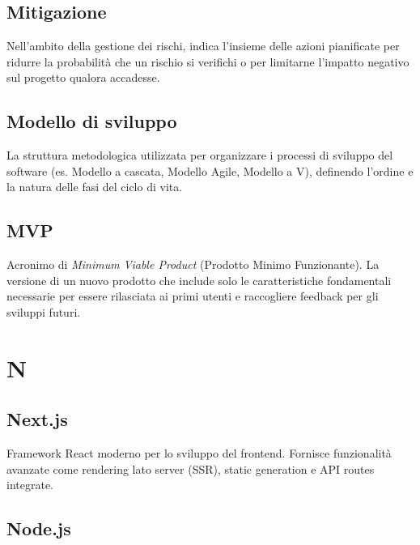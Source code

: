 \documentclass[a4paper, 11pt, oneside]{scrartcl} %
\begin{document}
\subsection*{Mitigazione}
Nell'ambito della gestione dei rischi, indica l'insieme delle azioni pianificate per ridurre la probabilità che un rischio si verifichi o per limitarne l'impatto negativo sul progetto qualora accadesse.
\vspace{0.5cm}

\subsection*{Modello di sviluppo}
La struttura metodologica utilizzata per organizzare i processi di sviluppo del software (es. Modello a cascata, Modello Agile, Modello a V), definendo l'ordine e la natura delle fasi del ciclo di vita.
\vspace{0.5cm}

\subsection*{MVP}
Acronimo di \textit{Minimum Viable Product} (Prodotto Minimo Funzionante). La versione di un nuovo prodotto che include solo le caratteristiche fondamentali necessarie per essere rilasciata ai primi utenti e raccogliere feedback per gli sviluppi futuri.
\vspace{0.5cm}


\section*{N}


\subsection*{Next.js}


Framework React moderno per lo sviluppo del frontend. Fornisce funzionalità avanzate come rendering lato server (SSR), static generation e API routes integrate.

\vspace{0.5cm}

\subsection*{Node.js}
\end{document}
